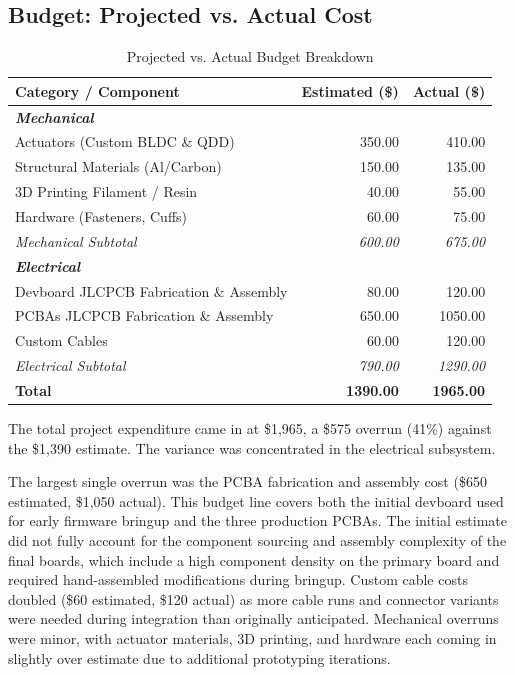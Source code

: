 \documentclass[11pt]{article}
\begin{document}
\subsection{Budget: Projected vs. Actual Cost}
\begin{table}[H]
\centering
\caption{Projected vs. Actual Budget Breakdown}
\label{tab:budget}
\begin{tabular}{lrr}
\toprule
\textbf{Category / Component} & \textbf{Estimated (\$)} & \textbf{Actual (\$)} \\
\midrule
\multicolumn{3}{l}{\textbf{\textit{Mechanical}}} \\
Actuators (Custom BLDC \& QDD) & 350.00 & 410.00 \\
Structural Materials (Al/Carbon) & 150.00 & 135.00 \\
3D Printing Filament / Resin & 40.00 & 55.00 \\
Hardware (Fasteners, Cuffs) & 60.00 & 75.00 \\
\midrule
\textit{Mechanical Subtotal} & \textit{600.00} & \textit{675.00} \\
\midrule
\multicolumn{3}{l}{\textbf{\textit{Electrical}}} \\
Devboard JLCPCB Fabrication \& Assembly & 80.00 & 120.00 \\
PCBAs JLCPCB Fabrication \& Assembly & 650.00 & 1050.00 \\
Custom Cables & 60.00 & 120.00 \\
\midrule
\textit{Electrical Subtotal} & \textit{790.00} & \textit{1290.00} \\
\midrule
\textbf{Total} & \textbf{1390.00} & \textbf{1965.00} \\
\bottomrule
\end{tabular}
\end{table}

The total project expenditure came in at \$1,965, a \$575 overrun (41\%) against the \$1,390 estimate. The variance was concentrated in the electrical subsystem.

The largest single overrun was the PCBA fabrication and assembly cost (\$650 estimated, \$1,050 actual). This budget line covers both the initial devboard used for early firmware bringup and the three production PCBAs. The initial estimate did not fully account for the component sourcing and assembly complexity of the final boards, which include a high component density on the primary board and required hand-assembled modifications during bringup. Custom cable costs doubled (\$60 estimated, \$120 actual) as more cable runs and connector variants were needed during integration than originally anticipated. Mechanical overruns were minor, with actuator materials, 3D printing, and hardware each coming in slightly over estimate due to additional prototyping iterations.
\end{document}
